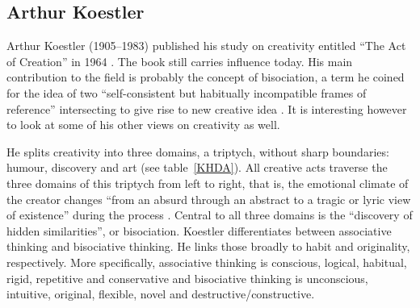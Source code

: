 \subsection*{Arthur Koestler}

Arthur Koestler (1905--1983) published his study on creativity entitled ``The Act of Creation'' in 1964 \autocite{Koestler1964}. The book still carries influence today. His main contribution to the field is probably the concept of \gls{bisociation}, a term he coined for the idea of two ``self-consistent but habitually incompatible frames of reference'' intersecting to give rise to new creative idea \autocite[p.35]{Koestler1964}. It is interesting however to look at some of his other views on creativity as well.

He splits creativity into three domains, a triptych, without sharp boundaries: humour, discovery and art (see table~\ref{KHDA}). All creative acts traverse the three domains of this triptych from left to right, that is, the emotional climate of the creator changes ``from an absurd through an abstract to a tragic or lyric view of existence'' during the process \autocite[p.27]{Koestler1964}. Central to all three domains is the ``discovery of hidden similarities'', or bisociation. Koestler differentiates between associative thinking and bisociative thinking. He links those broadly to habit and originality, respectively. More specifically, associative thinking is conscious, logical, habitual, rigid, repetitive and conservative and bisociative thinking is unconscious, intuitive, original, flexible, novel and destructive/constructive.


